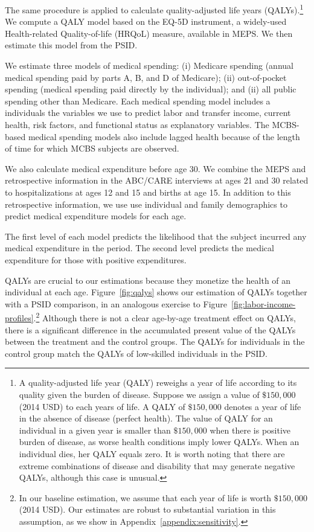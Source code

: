 The same procedure is applied to calculate quality-adjusted life years (QALYs).\footnote{A quality-adjusted life year (QALY) reweighs a year of life according to its quality given the burden of disease. Suppose we assign a value of $\$150,000$ (2014 USD) to each years of life. A QALY of $\$150,000$ denotes a year of life in the absence of disease (perfect health). The value of QALY for an individual in a given year is smaller than $\$150,000$ when there is positive burden of disease, as worse health conditions imply lower QALYs. When an individual dies, her QALY equals zero. It is worth noting that there are extreme combinations of disease and disability that may generate negative QALYs, although this case is unusual.} We compute a QALY model based on the EQ-5D instrument, a widely-used Health-related Quality-of-life (HRQoL) measure, available in MEPS. We then estimate this model from the PSID.

We estimate three models of medical spending: (i) Medicare spending (annual medical spending paid by parts A, B, and D of Medicare); (ii) out-of-pocket spending (medical spending paid directly by the individual); and (ii) all public spending other than Medicare. Each medical spending model includes a individuals the variables we use to predict labor and transfer income, current health, risk factors, and functional status as explanatory variables. The MCBS-based medical spending models also include lagged health because of the length of time for which MCBS subjects are observed.

We also calculate medical expenditure before age 30. We combine the MEPS and retrospective information in the ABC/CARE interviews at ages 21 and 30 related to hospitalizations at ages 12 and 15 and births at age 15. In addition to this retrospective information, we use use individual and family demographics to predict medical expenditure models for each age.

The first level of each model predicts the likelihood that the subject incurred any medical expenditure in the period. The second level predicts the medical expenditure for those with positive expenditures.

QALYs are crucial to our estimations because they monetize the health of an individual at each age. Figure~\ref{fig:qalys} shows our estimation of QALYs together with a PSID comparison, in an analogous exercise to Figure~\ref{fig:labor-income-profiles}.\footnote{In our baseline estimation, we assume that each year of life is worth  $\$150,000$ (2014 USD). Our estimates are robust to substantial variation in this assumption, as we show in Appendix~\ref{appendix:sensitivity}.} Although there is not a clear age-by-age treatment effect on QALYs, there is a significant difference in the accumulated present value of the QALYs between the treatment and the control groups. The QALYs for individuals in the control group match the QALYs of low-skilled individuals in the PSID.

